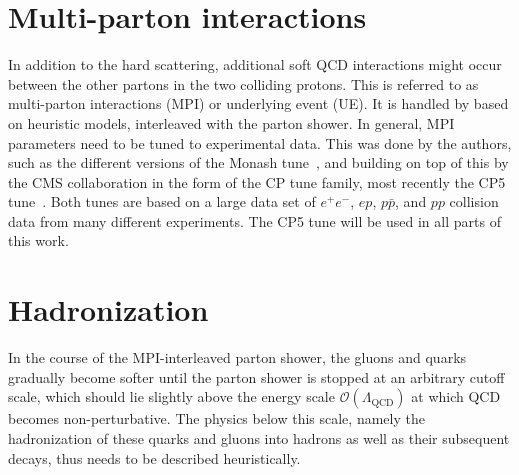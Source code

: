 


\section{Multi-parton interactions}
\label{sec:mc:mpi}

In addition to the hard scattering, additional soft QCD interactions might occur between the other partons in the two colliding protons. This is referred to as multi-parton interactions (MPI) or underlying event (UE). It is handled by \pythia based on heuristic models, interleaved with the parton shower. In general, MPI parameters need to be tuned to experimental data. This was done by the \pythia authors, such as the different versions of the Monash tune~\cite{Skands:2014pea}, and building on top of this by the CMS collaboration in the form of the CP tune family, most recently the CP5 tune~\cite{CMS:GEN-17-001}. Both tunes are based on a large data set of $e^+e^-$, $ep$, $p\bar{p}$, and $pp$ collision data from many different experiments. The CP5 tune will be used in all parts of this work.

\section{Hadronization}
\label{sec:mc:hadronization}

In the course of the MPI-interleaved parton shower, the gluons and quarks gradually become softer until the parton shower is stopped at an arbitrary cutoff scale, which should lie slightly above the energy scale $\mathcal{O}(\Lambda_{\mathrm{QCD}})$ at which QCD becomes non-perturbative.
The physics below this scale, namely 
the hadronization of these quarks and gluons into hadrons as well as their subsequent decays, thus needs to be described heuristically.

